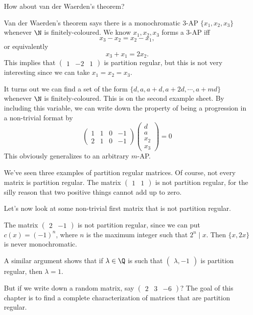 \documentclass[a4paper]{article}
\begin{document}
How about van der Waerden's theorem?
\begin{eg}
  Van der Waerden's theorem says there is a monochromatic $3$-AP $\{x_1, x_2, x_3\}$ whenever $\N$ is finitely-coloured. We know $x_1, x_2, x_3$ forms a $3$-AP iff
  \[
    x_3 - x_2 = x_2 - x_1,
  \]
  or equivalently
  \[
    x_3 + x_1 = 2 x_2.
  \]
  This implies that $\begin{pmatrix}1 & -2 & 1\end{pmatrix}$ is partition regular, but this is not very interesting since we can take $x_1 = x_2 = x_3$.

  It turns out we can find a set of the form $\{d, a, a + d, a + 2d, \cdots, a + md\}$ whenever $\N$ is finitely-coloured. This is on the second example sheet. By including this variable, we can write down the property of being a progression in a non-trivial format by
  \[
    \begin{pmatrix}
      1 & 1 & 0 & -1\\
      2 & 1 & 0 & -1
    \end{pmatrix}
    \begin{pmatrix}
      d \\ a \\ x_2 \\ x_3
    \end{pmatrix} = 0
  \]
  This obviously generalizes to an arbitrary $m$-AP.
\end{eg}
We've seen three examples of partition regular matrices. Of course, not every matrix is partition regular. The matrix $\begin{pmatrix}1 & 1\end{pmatrix}$ is not partition regular, for the silly reason that two positive things cannot add up to zero.

Let's now look at some non-trivial first matrix that is not partition regular.
\begin{eg}
  The matrix $\begin{pmatrix}2 & -1\end{pmatrix}$ is not partition regular, since we can put $c(x) = (-1)^n$, where $n$ is the maximum integer such that $2^n \mid x$. Then $\{x, 2x\}$ is never monochromatic.

  A similar argument shows that if $\lambda \in \Q$ is such that $\begin{pmatrix}\lambda, -1\end{pmatrix}$ is partition regular, then $\lambda = 1$.
\end{eg}
But if we write down a random matrix, say $\begin{pmatrix}2 & 3 & -6\end{pmatrix}$? The goal of this chapter is to find a complete characterization of matrices that are partition regular.
\end{document}
